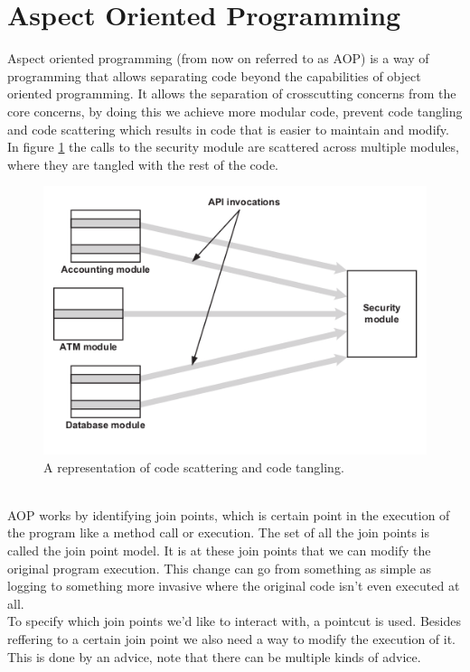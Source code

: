 \documentclass[a4paper]{report}
\begin{document}
\section{Aspect Oriented Programming}
Aspect oriented programming (from now on referred to as AOP) is a way of programming that allows separating code beyond the capabilities of object oriented programming. It allows the separation of crosscutting concerns from the core concerns, by doing this we achieve more modular code, prevent code tangling and code scattering which results in code that is easier to maintain and modify. In figure \ref{fig:Code_Scattering} the calls to the security module are scattered across multiple modules, where they are tangled with the rest of the code.
\begin{figure}[h!]
\centering
\includegraphics[scale=0.5]{images/Code_Scattering.png}
\caption{A representation of code scattering and code tangling.}
\label{fig:Code_Scattering}
\end{figure}\\
AOP works by identifying join points, which is certain point in the execution of the program like a method call or execution. The set of all the join points is called the join point model. It is at these join points that we can modify the original program execution. This change can go from something as simple as logging to something more invasive where the original code isn't even executed at all.\\
To specify which join points we'd like to interact with, a pointcut is used. Besides reffering to a certain join point we also need a way to modify the execution of it. This is done by an advice, note that there can be multiple kinds of advice.\\
\end{document}
